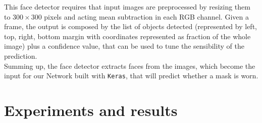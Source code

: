 \documentclass[10pt,twocolumn,letterpaper]{article}
\begin{document}
This face detector requires that input images are preprocessed by resizing them to $300\times300$ pixels and acting mean subtraction in each RGB channel. Given a frame, the output is composed by the list of objects detected (represented by left, top, right, bottom margin with coordinates represented as fraction of the whole image) plus a confidence value, that can be used to tune the sensibility of the prediction.\\

Summing up, the face detector extracts faces from the images, which become the input for our Network built with \texttt{Keras}, that will predict whether a mask is worn.



\section{Experiments and results}
\label{sec:results}
\end{document}
